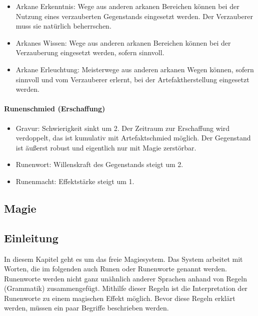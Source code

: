 \documentclass{article}
\begin{document}
\begin{itemize}
\item Arkane Erkenntnis: Wege aus anderen arkanen Bereichen können bei der Nutzung eines verzauberten Gegenstands eingesetzt werden. Der Verzauberer muss sie natürlich beherrschen.
\item Arkanes Wissen: Wege aus anderen arkanen Bereichen können bei der Verzauberung eingesetzt werden, sofern sinnvoll.
\item Arkane Erleuchtung: Meisterwege aus anderen arkanen Wegen können, sofern sinnvoll und vom Verzauberer erlernt, bei der Artefaktherstellung eingesetzt werden.
\end{itemize}

\paragraph{Runenschmied (Erschaffung)}

\begin{itemize}
\item Gravur: Schwierigkeit sinkt um 2. Der Zeitraum zur Erschaffung wird verdoppelt, das ist kumulativ mit Artefaktschmied möglich. Der Gegenstand ist äußerst robust und eigentlich nur mit Magie zerstörbar.
\item Runenwort: Willenskraft des Gegenstands steigt um 2.
\item Runenmacht: Effektstärke steigt um 1.
\end{itemize}

\begin{center}
\section{Magie}
\end{center}

\begin{center}
\subsection{Einleitung}
\end{center}

In diesem Kapitel geht es um das freie Magiesystem. Das System arbeitet mit Worten, die im folgenden auch Runen oder
Runenworte genannt werden. Runenworte werden nicht ganz unähnlich anderer Sprachen anhand von Regeln (Grammatik)
zusammengefügt. Mithilfe dieser Regeln ist die Interpretation der Runenworte zu einem magischen Effekt möglich.
Bevor diese Regeln erklärt werden, müssen ein paar Begriffe beschrieben werden.
\end{document}
